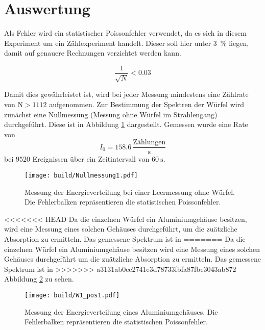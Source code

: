 \newpage
\section{Auswertung}

\label{sec:Auswertung}

Als Fehler wird ein statistischer Poissonfehler verwendet, da es sich in diesem
Experiment um ein Zählexperiment handelt. Dieser soll hier unter \SI{3}{\percent} liegen,
damit auf genauere Rechnungen verzichtet werden kann.

\begin{equation*}
  \frac{1}{\sqrt{N}} < 0.03
\end{equation*}

Damit dies gewährleistet ist, wird bei jeder Messung mindestens eine
Zählrate von $\text{N}>1112$ aufgenommen.
Zur Bestimmung der Spektren der Würfel wird zunächst eine Nullmessung (Messung
ohne Würfel im Strahlengang) durchgeführt. Diese ist in Abbildung \ref{fig:leer}
dargestellt. Gemessen wurde eine Rate von
\begin{equation*}
    I_0 = 158.6 \,\frac{\text{Zählungen}}{\text{s}}
\end{equation*}
bei $9520$ Ereignissen über ein Zeitintervall von $\SI{60}{\second}$.

\begin{figure}[htb]
  \centering
  \texttt{[image: build/Nullmessung1.pdf]}
  \caption{Messung der Energieverteilung bei einer Leermessung ohne Würfel. Die
  Fehlerbalken repräsentieren die statistischen Poissonfehler.}
  \label{fig:leer}
\end{figure}

<<<<<<< HEAD
Da die einzelnen Würfel ein Aluminiumgehäuse besitzen, wird eine Messung eines solchen
Gehäuses durchgeführt, um die zuätzliche Absorption zu ermitteln. Das gemessene Spektrum ist in
=======
Da die einzelnen Würfel ein Aluminiumgehäuse besitzen wird eine Messung eines solchen
Gehäuses durchgeführt um die zuätzliche Absorption zu ermitteln. Das gemessene Spektrum ist in
>>>>>>> a3131ab0ec2741e3d78733fbfa87fbe3043ab872
Abbildung \ref{fig:alu} zu sehen.

\begin{figure}[htb]
  \centering
  \texttt{[image: build/W1\_pos1.pdf]}
  \caption{Messung der Energieverteilung eines Aluminiumgehäuses. Die Fehlerbalken
  repräsentieren die statistischen Poissonfehler.}
  \label{fig:alu}
\end{figure}

